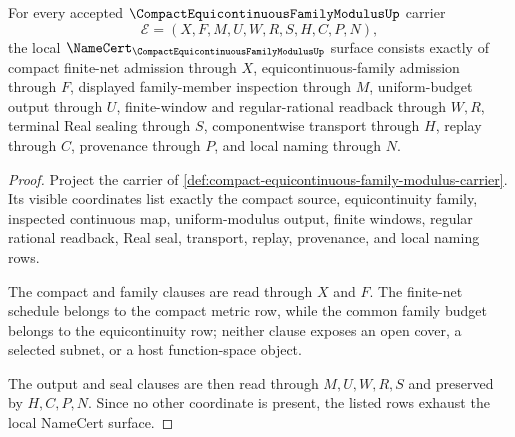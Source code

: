 \begin{theorem}
\label{thm:compact-equicontinuous-family-modulus-namecert-obligations}
For every accepted $\CompactEquicontinuousFamilyModulusUp$ carrier
$$
\mathcal{E}=(X,F,M,U,W,R,S,H,C,P,N),
$$
the local $\NameCert_{\CompactEquicontinuousFamilyModulusUp}$ surface consists exactly of compact finite-net admission through $X$, equicontinuous-family admission through $F$, displayed family-member inspection through $M$, uniform-budget output through $U$, finite-window and regular-rational readback through $W,R$, terminal Real sealing through $S$, componentwise transport through $H$, replay through $C$, provenance through $P$, and local naming through $N$.
\end{theorem}
\begin{proof}
Project the carrier of \autoref{def:compact-equicontinuous-family-modulus-carrier}. Its visible coordinates list exactly the compact source, equicontinuity family, inspected continuous map, uniform-modulus output, finite windows, regular rational readback, Real seal, transport, replay, provenance, and local naming rows.

The compact and family clauses are read through $X$ and $F$. The finite-net schedule belongs to the compact metric row, while the common family budget belongs to the equicontinuity row; neither clause exposes an open cover, a selected subnet, or a host function-space object.

The output and seal clauses are then read through $M,U,W,R,S$ and preserved by $H,C,P,N$. Since no other coordinate is present, the listed rows exhaust the local NameCert surface.
\end{proof}

